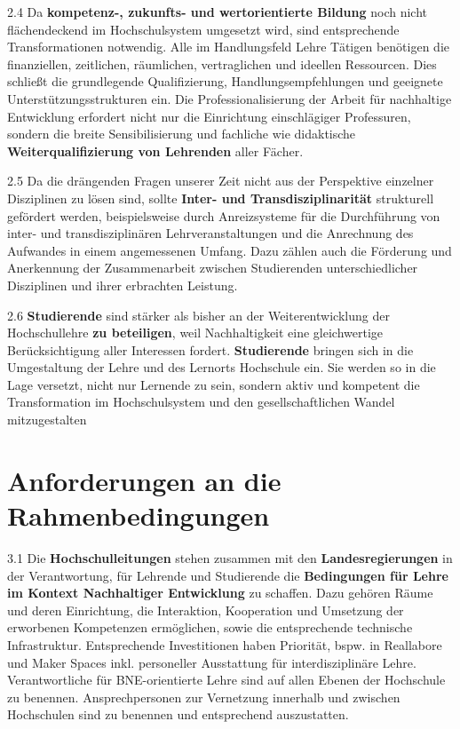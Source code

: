 \documentclass[DIV=12]{scrartcl}
\begin{document}
2.4 Da \textbf{kompetenz-, zukunfts- und wertorientierte Bildung} noch
nicht flächendeckend im Hochschulsystem umgesetzt wird, sind
entsprechende Transformationen notwendig. Alle im Handlungsfeld Lehre
Tätigen benötigen die finanziellen, zeitlichen, räumlichen,
vertraglichen und ideellen Ressourcen. Dies schließt die grundlegende
Qualifizierung, Handlungsempfehlungen und geeignete
Unterstützungsstrukturen ein. Die Professionalisierung der Arbeit für
nachhaltige Entwicklung erfordert nicht nur die Einrichtung
einschlägiger Professuren, sondern die breite Sensibilisierung und
fachliche wie didaktische \textbf{Weiterqualifizierung von Lehrenden}
aller Fächer.

2.5 Da die drängenden Fragen unserer Zeit nicht aus der Perspektive
einzelner Disziplinen zu lösen sind, sollte \textbf{Inter- und
Transdisziplinarität} strukturell gefördert werden, beispielsweise durch
Anreizsysteme für die Durchführung von inter- und transdisziplinären
Lehrveranstaltungen und die Anrechnung des Aufwandes in einem
angemessenen Umfang. Dazu zählen auch die Förderung und Anerkennung der
Zusammenarbeit zwischen Studierenden unterschiedlicher Disziplinen und
ihrer erbrachten Leistung.

2.6 \textbf{Studierende} sind stärker als bisher an der
Weiterentwicklung der Hochschullehre \textbf{zu beteiligen}, weil
Nachhaltigkeit eine gleichwertige Berücksichtigung aller Interessen
fordert. \textbf{Studierende} bringen sich in die Umgestaltung der Lehre
und des Lernorts Hochschule ein. Sie werden so in die Lage versetzt,
nicht nur Lernende zu sein, sondern aktiv und kompetent die
Transformation im Hochschulsystem und den gesellschaftlichen Wandel
mitzugestalten

\hypertarget{anforderungen-an-die-rahmenbedingungen}{%
\section{Anforderungen an die
Rahmenbedingungen}\label{anforderungen-an-die-rahmenbedingungen}}

3.1 Die \textbf{Hochschulleitungen} stehen zusammen mit den
\textbf{Landesregierungen} in der Verantwortung, für Lehrende und
Studierende die \textbf{Bedingungen für Lehre im Kontext Nachhaltiger
Entwicklung} zu schaffen. Dazu gehören Räume und deren Einrichtung, die
Interaktion, Kooperation und Umsetzung der erworbenen Kompetenzen
ermöglichen, sowie die entsprechende technische Infrastruktur.
Entsprechende Investitionen haben Priorität, bspw. in Reallabore und
Maker Spaces inkl. personeller Ausstattung für interdisziplinäre Lehre.
Verantwortliche für BNE-orientierte Lehre sind auf allen Ebenen der
Hochschule zu benennen. Ansprechpersonen zur Vernetzung innerhalb und
zwischen Hochschulen sind zu benennen und entsprechend auszustatten.
\end{document}

